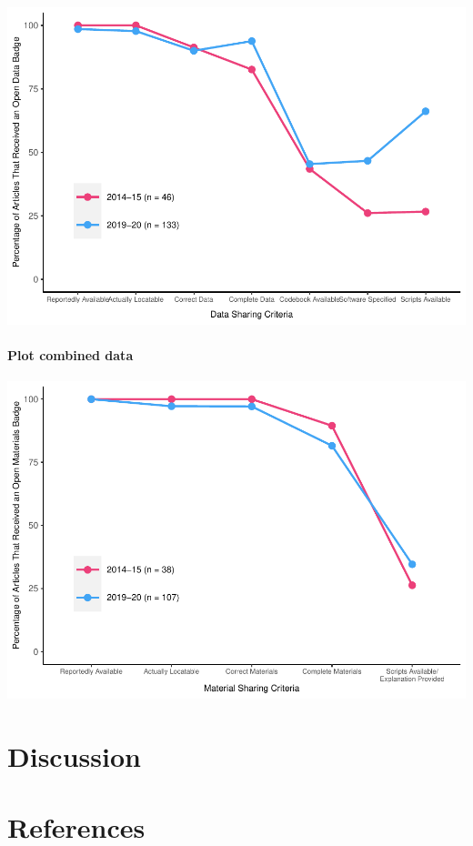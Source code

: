 \documentclass[
  english,
  man]{apa6}
\let\oldparagraph\paragraph
\renewcommand{\paragraph}[1]{\oldparagraph{#1}\mbox{}}
\begin{document}
\includegraphics{icd_special_issue_files/figure-latex/combo-plot-1.pdf}

\hypertarget{plot-combined-data-1}{%
\paragraph{Plot combined data}\label{plot-combined-data-1}}

\includegraphics{icd_special_issue_files/figure-latex/combo-m-plot-1.pdf}

\hypertarget{discussion}{%
\section{Discussion}\label{discussion}}

\newpage

\hypertarget{references}{%
\section{References}\label{references}}
\end{document}
